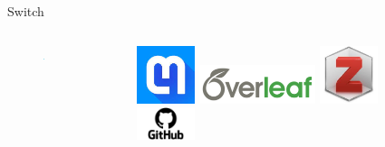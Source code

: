 \begin{frame}[fragile]{Switch}
\begin{columns}[c]
    \begin{column}{.3\textwidth}
    \begin{figure}
        \centering
        \includegraphics[width=0.8\textwidth]{img/rightarrow.png}
        
    \end{figure}      
    \end{column}
    \begin{column}{.5\textwidth}
    \begin{figure}
        \centering
        \includegraphics[width=0.2\textwidth]{img/mathpix.jpeg}
        \includegraphics[width=0.4\textwidth]{img/overleaf_wide_colour_light_bg.png}
        \includegraphics[width=0.2\textwidth]{img/zotero.jpeg}
        \includegraphics[width=0.2\textwidth]{img/github.png}
    \end{figure}
    \end{column}
\end{columns}
\end{frame}
